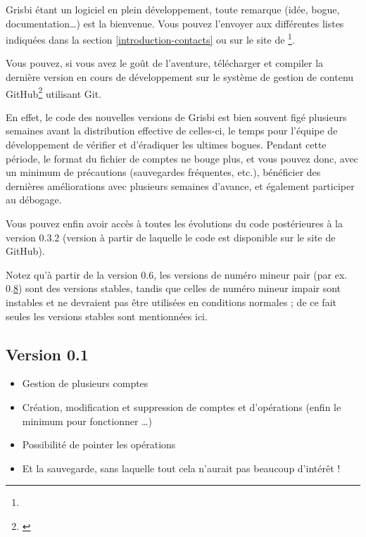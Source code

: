Grisbi étant un logiciel en plein développement, toute remarque (idée,
bogue, documentation\dots{}) est la bienvenue. Vous pouvez l'envoyer aux différentes listes indiquées dans la section \vref{introduction-contacts}  ou sur le site de \footnote{\urlGrisbi{}}.

Vous pouvez, si vous avez le goût de l'aventure, télécharger et compiler la dernière version en 
cours de développement sur le système de gestion de contenu \gls{GitHub}\footnote{\urlGitHubGrisbi{}\label{siteGitHubGrisbi}} utilisant \gls{Git}.

En effet, le code des nouvelles versions de Grisbi est bien souvent figé
plusieurs semaines avant la distribution effective de celles-ci, le temps pour 
l'équipe de développement de vérifier et d'éradiquer les ultimes bogues. Pendant cette période, le format du fichier de comptes ne bouge plus, et vous pouvez donc, avec un minimum de précautions (sauvegardes fréquentes, etc.), bénéficier des dernières améliorations avec plusieurs semaines d'avance, et également participer au débogage.

Vous pouvez enfin avoir accès à toutes les évolutions du code postérieures à la version 0.3.2 (version à partir de laquelle le code est disponible sur le site de \gls{GitHub}).

Notez qu'à partir de la version 0.6, les versions de numéro mineur pair (par ex. 0.\underline8) sont des versions stables, tandis que celles de numéro mineur impair sont instables et ne devraient pas être utilisées en conditions normales ; de ce fait seules les versions stables sont mentionnées ici.

\newpage

\subsection{Version 0.1}

\begin{itemize}
	\item Gestion de plusieurs comptes
	\item Création, modification et suppression de comptes et d'opérations (enfin le minimum pour fonctionner \dots{})
	\item Possibilité de pointer les opérations
	\item Et la sauvegarde, sans laquelle tout cela n'aurait pas beaucoup d'intérêt !
\end{itemize}


